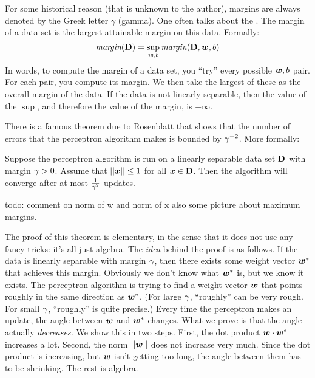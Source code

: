 For some historical reason (that is unknown to the author), margins
are always denoted by the Greek letter $\gamma$ (gamma).  One often
talks about the .  The margin of a data
set is the largest attainable margin on this data.  Formally:
\begin{equation} \label{eq:margin2}
\textit{margin}(\text{\bf D})
= 
\sup_{{\boldsymbol{w}},b} \textit{margin}(\text{\bf D}, {\boldsymbol{w}}, b)
\end{equation}
In words, to compute the margin of a data set, you ``try'' every
possible ${\boldsymbol{w}},b$ pair.  For each pair, you compute its margin.  We
then take the largest of these as the overall margin of the
data.  If the data is not linearly separable, then the value
of the $\sup$, and therefore the value of the margin, is $-\infty$.

There is a famous theorem due to
Rosenblatt that shows that the number
of errors that the perceptron algorithm makes is bounded by
$\gamma^{-2}$.  More formally:

\begin{theorem} \label{thm:perc:perc}
  Suppose the perceptron algorithm is run on a linearly separable data
  set $\text{\bf D}$ with margin $\gamma > 0$.  Assume that $\left\vert\left\vert {\boldsymbol{x}} \right\vert\right\vert \leq 1$
  for all ${\boldsymbol{x}} \in \text{\bf D}$.  Then the algorithm will converge after at
  most $\frac 1 {\gamma^2}$ updates.
\end{theorem}

todo: comment on norm of w and norm of x  also some picture about
maximum margins.

The proof of this theorem is elementary, in the sense that it does not
use any fancy tricks: it's all just algebra.  The \emph{idea} behind
the proof is as follows.  If the data is linearly separable with
margin $\gamma$, then there exists some weight vector ${\boldsymbol{w}}^*$ that
achieves this margin.  Obviously we don't know what ${\boldsymbol{w}}^*$ is, but we
know it exists.  The perceptron algorithm is trying to find a weight
vector ${\boldsymbol{w}}$ that points roughly in the same direction as ${\boldsymbol{w}}^*$.
(For large $\gamma$, ``roughly'' can be very rough.  For small $\gamma$,
``roughly'' is quite precise.)  Every time the perceptron makes an
update, the angle between ${\boldsymbol{w}}$ and ${\boldsymbol{w}}^*$ changes.  What we prove is
that the angle actually \emph{decreases.}  We show this in two steps.
First, the dot product ${\boldsymbol{w}} \cdot {\boldsymbol{w}}^*$ increases a lot.  Second,
the norm $\left\vert\left\vert {\boldsymbol{w}} \right\vert\right\vert$ does not increase very much.  Since the dot
product is increasing, but ${\boldsymbol{w}}$ isn't getting too long, the angle
between them has to be shrinking.  The rest is algebra.

